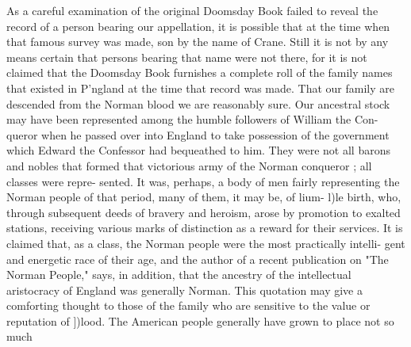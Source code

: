 \documentclass[oneside]{book}
\begin{document}
As a careful examination of the original Doomsday Book failed 
to reveal the record of a person bearing our appellation, it is 
possible that at the time when that famous survey was made, 
son by the name of Crane. Still it is not by any means certain 
that persons bearing that name were not there, for it is not 
claimed that the Doomsday Book furnishes a complete roll of the 
family names that existed in P'ngland at the time that record was 
made. That our family are descended from the Norman blood 
we are reasonably sure. Our ancestral stock may have been 
represented among the humble followers of William the Con- 
queror when he passed over into England to take possession of 
the government which Edward the Confessor had bequeathed to 
him. They were not all barons and nobles that formed that 
victorious army of the Norman conqueror ; all classes were repre- 
sented. It was, perhaps, a body of men fairly representing the 
Norman people of that period, many of them, it may be, of lium- 
l)le birth, who, through subsequent deeds of bravery and heroism, 
arose by promotion to exalted stations, receiving various marks 
of distinction as a reward for their services. It is claimed that, 
as a class, the Norman people were the most practically intelli- 
gent and energetic race of their age, and the author of a recent 
publication on "The Norman People," says, in addition, that the 
ancestry of the intellectual aristocracy of England was generally 
Norman. This quotation may give a comforting thought to those 
of the family who are sensitive to the value or reputation of ])lood. 
The American people generally have grown to place not so much 
\end{document}
